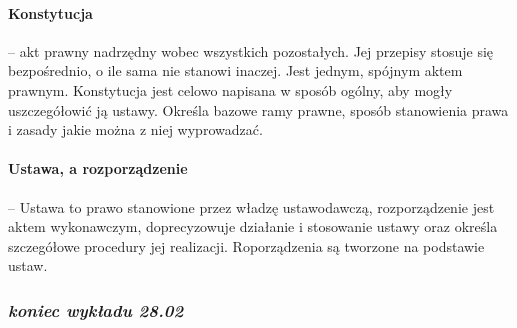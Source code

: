 \documentclass{article}
\begin{document}
\paragraph{Konstytucja}-- akt prawny nadrzędny wobec wszystkich pozostałych.
Jej przepisy stosuje się bezpośrednio, o ile sama nie stanowi inaczej.
Jest jednym, spójnym aktem prawnym. Konstytucja jest celowo napisana w sposób ogólny, aby mogły
uszczegółowić ją ustawy.
Określa bazowe ramy prawne, sposób stanowienia prawa i zasady jakie można z niej wyprowadzać.

\paragraph{Ustawa, a rozporządzenie} -- Ustawa to prawo stanowione przez władzę ustawodawczą,
rozporządzenie jest aktem wykonawczym, doprecyzowuje działanie i stosowanie ustawy oraz określa
szczegółowe procedury jej realizacji. Roporządzenia są tworzone na podstawie ustaw.

\subsubsection*{\textit{koniec wykładu 28.02}}
\end{document}
